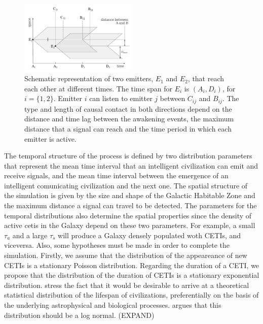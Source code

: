 \documentclass[crop]{CSLB}%
\begin{document}
  
\begin{figure}
   \centering
   \includegraphics[width=0.5\textwidth]{abcd.pdf}
   \caption{Schematic representation of two emitters, $E_1$ and $E_2$,
   that reach each other at different times.  The time span for $E_i$
   is $(A_i, D_i)$, for $i=\{1,2\}$.  Emitter $i$ can listen to
   emitter $j$ between $C_{ij}$ and $B_{ij}$.
   The type and length of causal contact in both directions depend on
   the distance and time lag between the awakening events, the maximum
   distance that a signal can reach and the time period in which each
   emitter is active.}
   \label{F_abcd}
\end{figure}
                               

The temporal structure of the process is defined by two distribution
parameters that represent the mean time interval that an intelligent
civilization can emit and receive signals, and the mean time interval
between the emergence of an intelligent comunicating civilization and
the next one.
%
The spatial structure of the simulation is given by the size and shape
of the Galactic Habitable Zone and the maximum distance a signal can
travel to be detected.
%
The parameters for the temporal distributions also determine the
spatial properties since the density of active cetis in the Galaxy
depend on these two parameters.
%
For example, a small $\tau_a$ and a large $\tau_s$ will produce a
Galaxy densely populated woth CETIs, and viceversa.
%
Also, some hypotheses must be made in order to complete the
simulation.
%
Firstly, we assume that the distribution of the appeareance of new
CETIs is a stationary Poisson distribution.
%
Regarding the duration of a CETI, we propose that the distribution of
the duration of CETIs is a stationary exponential distribution.
%
\citet{Balbi2018} stress the fact that it would be desirable to arrive
at a theoretical statistical distribution of the lifespan of
civilizations, preferentially on the basis of the underlying
astrophysical and biological processes.
%
\citet{Maccone} argues that this distribution should be a log normal.
(EXPAND)
\end{document}
